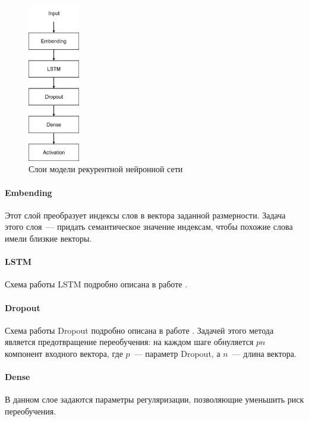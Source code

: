 \documentclass[14pt]{matmex-diploma-custom}
\begin{document}
\begin{figure}[h]
\centering
\includegraphics[width=0.2\textwidth]{img/layers}
\caption{Слои модели рекурентной нейронной сети}
\label{img:layers}
\end{figure}

\paragraph{Embending}

Этот слой преобразует индексы слов в вектора заданной размерности. Задача этого слоя~--- придать семантическое значение индексам, чтобы похожие слова имели близкие векторы.

\paragraph{LSTM}

Схема работы LSTM подробно описана в работе \cite{tools:lstm}.

\paragraph{Dropout}

Схема работы Dropout подробно описана в работе \cite{tools:dropout}. Задачей этого метода является предотвращение переобучения: на каждом шаге обнуляется $pn$ компонент входного вектора, где $p$~--- параметр Dropout, а $n$~--- длина вектора.

\paragraph{Dense}

В данном слое задаются параметры регуляризации, позволяющие уменьшить риск переобучения.
\end{document}
